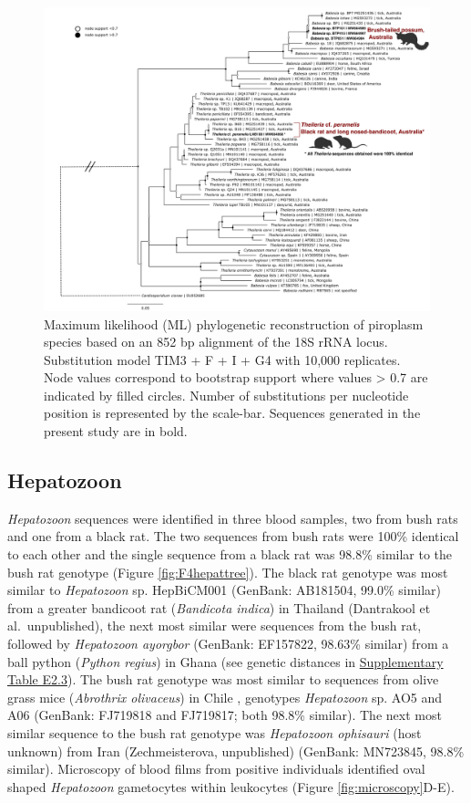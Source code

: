 \documentclass[a4paper, nobind]{templates/ociamthesis}
\begin{document}
\begin{figure}
\includegraphics[width=0.95\linewidth]{figures/ms-figs/Ch4-pirotree} \caption[Phylogeny of piroplasm species.]{Maximum likelihood (ML) phylogenetic reconstruction of piroplasm species based on an 852 bp alignment of the 18S rRNA locus. Substitution model TIM3 + F + I + G4 with 10,000 replicates. Node values correspond to bootstrap support where values > 0.7 are indicated by filled circles. Number of substitutions per nucleotide position is represented by the scale-bar. Sequences generated in the present study are in bold.}\label{fig:F4pirotree}
\end{figure}

\hypertarget{hepatozoon}{%
\subsection{Hepatozoon}\label{hepatozoon}}

\emph{Hepatozoon} sequences were identified in three blood samples, two from bush rats and one from a black rat.
The two sequences from bush rats were 100\% identical to each other and the single sequence from a black rat was 98.8\% similar to the bush rat genotype (Figure \ref{fig:F4hepattree}).
The black rat genotype was most similar to \emph{Hepatozoon} sp. HepBiCM001 (GenBank: AB181504, 99.0\% similar) from a greater bandicoot rat (\emph{Bandicota indica}) in Thailand (Dantrakool et al.~unpublished), the next most similar were sequences from the bush rat, followed by \emph{Hepatozoon ayorgbor} (GenBank: EF157822, 98.63\% similar) from a ball python (\emph{Python regius}) in Ghana \autocite{slobodaNEWSPECIESHEPATOZOON2007} (see genetic distances in \protect\hyperlink{supplementary-table-e2.3}{Supplementary Table E2.3}).
The bush rat genotype was most similar to sequences from olive grass mice (\emph{Abrothrix olivaceus}) in Chile \autocite{merinoMolecularCharacterizationAncient2009}, genotypes \emph{Hepatozoon} sp. AO5 and A06 (GenBank: FJ719818 and FJ719817; both 98.8\% similar).
The next most similar sequence to the bush rat genotype was \emph{Hepatozoon ophisauri} (host unknown) from Iran (Zechmeisterova, unpublished) (GenBank: MN723845, 98.8\% similar).
Microscopy of blood films from positive individuals identified oval shaped \emph{Hepatozoon} gametocytes within leukocytes (Figure \ref{fig:microscopy}D-E).
\end{document}
